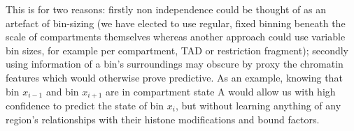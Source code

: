 \documentclass[a4paper,11pt,oneside]{book}
\begin{document}
This is for two reasons: firstly non independence could be thought of as an artefact of bin-sizing (we have elected to use regular, fixed binning beneath the scale of compartments themselves whereas another approach could use variable bin sizes, for example per compartment, TAD or restriction fragment); secondly using information of a bin's surroundings may obscure by proxy the chromatin features which would otherwise prove predictive. As an example, knowing that bin $x_{i-1}$ and bin $x_{i+1}$ are in compartment state A would allow us with high confidence to predict the state of bin $x_i$, but without learning anything of any region's relationships with their histone modifications and bound factors.

\begin{small}

\end{small}
\end{document}
